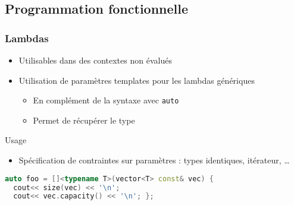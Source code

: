 \documentclass[C++.tex]{subfiles}
\begin{document}
\subsection*{Programmation fonctionnelle}
\begin{frame}[fragile]
	\frametitle{Lambdas}
	\begin{itemize}
		\item Utilisables dans des contextes non évalués


		\item Utilisation de paramètres templates pour les lambdas génériques
		\begin{itemize}
			\item En complément de la syntaxe avec \lstinline|auto|


			\item Permet de récupérer le type
		\end{itemize}
	\end{itemize}

	\begin{block}{Usage}
		\begin{itemize}
			\item Spécification de contraintes sur paramètres : types identiques, itérateur, \ldots{}
		\end{itemize}
	\end{block}

	\begin{lstlisting}[language=C++]
auto foo = []<typename T>(vector<T> const& vec) { 
  cout<< size(vec) << '\n';
  cout<< vec.capacity() << '\n'; };\end{lstlisting}


\end{frame}
\end{document}
